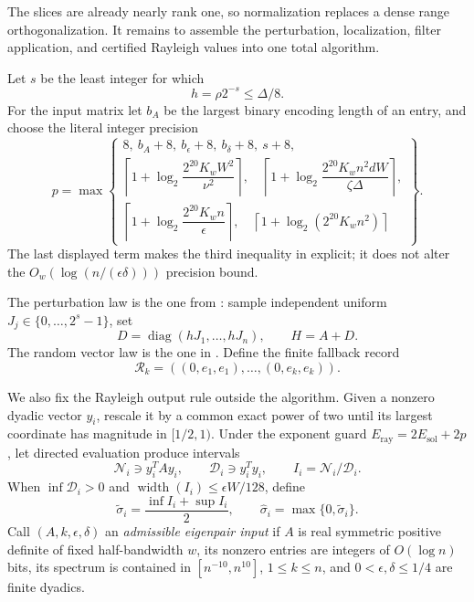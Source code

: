 \documentclass[11pt]{article}
\begin{document}
The slices are already nearly rank one, so normalization replaces a dense
range orthogonalization.  It remains to assemble the perturbation,
localization, filter application, and certified Rayleigh values into one
total algorithm.

Let $s$ be the least integer for which
\begin{equation}
 \label{eq:perturbation-grid}
 h=\rho2^{-s}\leq\Delta/8.
\end{equation}
For the input matrix let $b_A$ be the largest binary encoding length of an
entry, and choose the literal integer precision
\begin{equation}
 \label{eq:chosen-precision}
 p=\max\left\{
 \begin{array}{l}
  8,\ b_A+8,\ b_\epsilon+8,\ b_\delta+8,\ s+8,\\[2pt]
  \left\lceil1+\log_2\dfrac{2^{20}K_wW^2}{\nu^2}\right\rceil,\quad
  \left\lceil1+\log_2
   \dfrac{2^{20}K_wn^2dW}{\zeta\Delta}\right\rceil,\\[6pt]
  \left\lceil1+\log_2\dfrac{2^{20}K_wn}{\epsilon}\right\rceil,\quad
  \left\lceil1+\log_2(2^{20}K_wn^2)\right\rceil
 \end{array}
 \right\}.
\end{equation}
The last displayed term makes the third inequality in
 explicit; it does not alter the
$O_w(\log(n/(\epsilon\delta)))$ precision bound.

The perturbation law is the one from : sample independent
uniform $J_j\in\{0,\ldots,2^s-1\}$, set
\begin{equation}
 \label{eq:finite-perturbation}
 D=\operatorname{diag}(hJ_1,\ldots,hJ_n),
 \qquad
 H=A+D.
\end{equation}
The random vector law is the one in .  Define the
finite fallback record
\begin{equation}
 \label{eq:fallback-record}
 \mathcal R_k=((0,e_1,e_1),\ldots,(0,e_k,e_k)).
\end{equation}

We also fix the Rayleigh output rule outside the algorithm.  Given a nonzero
dyadic vector $y_i$, rescale it by a common exact power of two until its
largest coordinate has magnitude in $[1/2,1)$.  Under the exponent guard
$E_{\mathrm{ray}}=2E_{\mathrm{sol}}+2p$, let directed evaluation produce
intervals
\begin{equation}
 \label{eq:rayleigh-intervals}
 \mathcal N_i\ni y_i^TAy_i,
 \qquad
 \mathcal D_i\ni y_i^Ty_i,
 \qquad
 I_i=\mathcal N_i/\mathcal D_i.
\end{equation}
When $\inf\mathcal D_i>0$ and
$\operatorname{width}(I_i)\leq\epsilon W/128$, define
\begin{equation}
 \label{eq:rayleigh-output}
 \widetilde\sigma_i=\frac{\inf I_i+\sup I_i}{2},
 \qquad
 \widehat\sigma_i=\max\{0,\widetilde\sigma_i\}.
\end{equation}
Call $(A,k,\epsilon,\delta)$ an \emph{admissible eigenpair input} if $A$ is
real symmetric positive definite of fixed half-bandwidth $w$, its nonzero
entries are integers of $O(\log n)$ bits, its spectrum is contained in
$[n^{-10},n^{10}]$, $1\leq k\leq n$, and
$0<\epsilon,\delta\leq1/4$ are finite dyadics.
\end{document}
